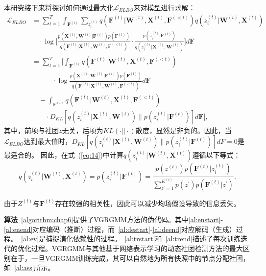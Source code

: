 本研究接下来将探讨如何通过最大化$\mathcal{L}_{ELBO}$来对模型进行求解：
\begin{align}
 {\mathcal{L}_{ELBO}} & = \sum_{t=1}^T \int_{\bm{F}^{(t)}} \sum_{z_i^{(t)}} q(\bm{F}^{(t)}|\bm{W}^{(t)},\bm{X}^{(t)},\bm{F}^{(<t)})q(z_i^{(t)}|\bm{W}^{(t)},\bm{X}^{(t)}) \nonumber \\
 & \quad \cdot\log\Bigg[\frac{p(\bm{X}^{(t)}, \bm{W}^{(t)} | \bm{F}^{(t)}) p(\bm{F}^{(t)})}{q(\bm{F}^{(t)}|\bm{X}^{(t)},\bm{W}^{(t)}, \bm{F}^{(< t)})} \cdot\frac{p(z_i^{(t)}|\bm{F}^{(t)})}{q(z_i^{(t)}|\bm{X}^{(t)},\bm{W}^{(t)})} \Bigg]d\bm{F}\nonumber\\
 & = \sum_{t=1}^T \Bigg[\int_{\bm{F}^{(t)}}q(\bm{F}^{(t)}|\bm{W}^{(t)},\bm{X}^{(t)},\bm{F}^{(< t)}) \nonumber \\ 
 & \quad \quad \quad \cdot \log\frac{p(\bm{X}^{(t)}, \bm{W}^{(t)} | \bm{F}^{(t)}) p(\bm{F}^{(t)})}{q(\bm{F}^{(t)}|\bm{X}^{(t)},\bm{W}^{(t)}, \bm{F}^{(< t)})} d\bm{F} \nonumber \\
 & \quad - \int_{\bm{F}^{(t)}} q(\bm{F}^{(t)}|\bm{W}^{(t)},\bm{X}^{(t)},\bm{F}^{(< t)}) \nonumber\\
 & \quad \quad \cdot D_{KL}\left[q(z_i^{(t)}|\bm{X}^{(t)},\bm{W}^{(t)}) \parallel p(z_i^{(t)}|\bm{F}^{(t)})\right] d\bm{F} \Bigg],
\end{align}
其中，前项与社团$z$无关，后项为$KL(\cdot || \cdot)$散度，显然是非负的。因此，当$\mathcal{L}_{ELBO}$达到最大值时，$D_{KL}\left[q(z_i^{(t)}|\bm{X}^{(t)},\bm{W}^{(t)}) \parallel p(z_i^{(t)}|\bm{F}^{(t)})\right] dF =0$是最适合的。 
因此，在式~(\ref{eq:14})中计算$q(z_i^{(t)}|\bm{W}^{(t)},\bm{X}^{(t)})$遵循以下等式：
\begin{equation}
    q(z_i^{(t)}|\bm{W}^{(t)},\bm{X}^{(t)}) = p(z_i^{(t)}|\bm{F}^{(t)}) =\frac{p(z^{(t)})p(\bm{F}^{(t)}|z_i^{(t)})}{\sum_{z^{'}=1}^{K^{(t)}} p(z^{'})p(\bm{F}^{(t)}|z^{'})}.
\end{equation}

由于$Z^{(t)}$与$\bm{F}^{(t)}$存在较强的相关性，因此可以减少均场假设导致的信息丢失。








\textbf{算法}~\ref{algorithm:chap6}提供了VGRGMM方法的伪代码。其中\ref{al:enstart}-\ref{al:enend}对应编码（推断）过程，而~\ref{al:destart}-\ref{al:deend}对应解码（生成）过程。~\ref{al:ev}是捕捉演化依赖性的过程。~\ref{al:trstart}和~\ref{al:trend}描述了每次训练迭代的优化过程。VGRGMM与其他基于网络表示学习的动态社团检测方法的最大区别在于，一旦VGRGMM训练完成，其可以自然地为所有快照中的节点分配社团，如~\ref{al:ass}所示。

